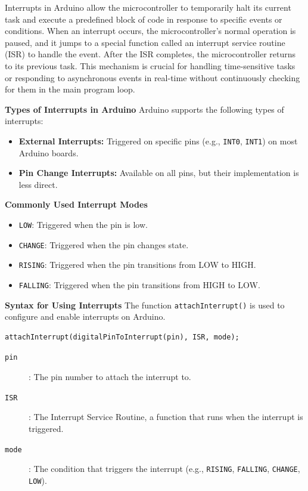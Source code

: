 \documentclass{article}
\numberwithin{equation}{section}
\numberwithin{figure}{section}
\numberwithin{table}{section}
\begin{document}
Interrupts in Arduino allow the microcontroller to temporarily halt its current task and execute a predefined block of code in response to specific events or conditions. When an interrupt occurs, the microcontroller's normal operation is paused, and it jumps to a special function called an interrupt service routine (ISR) to handle the event. After the ISR completes, the microcontroller returns to its previous task. This mechanism is crucial for handling time-sensitive tasks or responding to asynchronous events in real-time without continuously checking for them in the main program loop.

\textbf{Types of Interrupts in Arduino}
Arduino supports the following types of interrupts:
\begin{itemize}
    \item \textbf{External Interrupts:} Triggered on specific pins (e.g., \texttt{INT0}, \texttt{INT1}) on most Arduino boards.
    \item \textbf{Pin Change Interrupts:} Available on all pins, but their implementation is less direct.
\end{itemize}

\textbf{Commonly Used Interrupt Modes}
\begin{itemize}
    \item \texttt{LOW}: Triggered when the pin is low.
    \item \texttt{CHANGE}: Triggered when the pin changes state.
    \item \texttt{RISING}: Triggered when the pin transitions from LOW to HIGH.
    \item \texttt{FALLING}: Triggered when the pin transitions from HIGH to LOW.
\end{itemize}

\textbf{Syntax for Using Interrupts}
The function \texttt{attachInterrupt()} is used to configure and enable interrupts on Arduino.

\begin{lstlisting}[caption={Syntax for attachInterrupt}]
attachInterrupt(digitalPinToInterrupt(pin), ISR, mode);
\end{lstlisting}

\begin{description}
    \item[\texttt{pin}]: The pin number to attach the interrupt to.
    \item[\texttt{ISR}]: The Interrupt Service Routine, a function that runs when the interrupt is triggered.
    \item[\texttt{mode}]: The condition that triggers the interrupt (e.g., \texttt{RISING}, \texttt{FALLING}, \texttt{CHANGE}, \texttt{LOW}).
\end{description}
\end{document}
